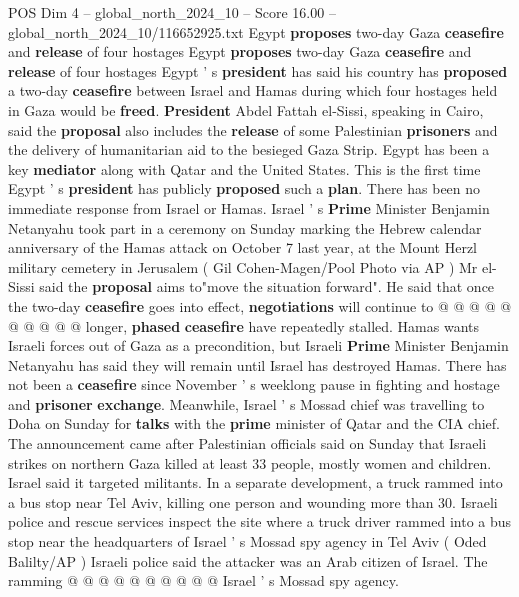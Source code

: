 \begin{textsample}{POS Dim 4 – global\_north\_2024\_10 – Score 16.00 – global\_north\_2024\_10/116652925.txt}  \label{ex:f4_pos_408}
Egypt \textbf{proposes} two-day Gaza \textbf{ceasefire} and \textbf{release} of four hostages Egypt \textbf{proposes} two-day Gaza \textbf{ceasefire} and \textbf{release} of four hostages Egypt ' s \textbf{president} has said his country has \textbf{proposed} a two-day \textbf{ceasefire} between Israel and Hamas during which four hostages held in Gaza would be \textbf{freed}. \textbf{President} Abdel Fattah el-Sissi, speaking in Cairo, said the \textbf{proposal} also includes the \textbf{release} of some Palestinian \textbf{prisoners} and the delivery of humanitarian aid to the besieged Gaza Strip.
Egypt has been a key \textbf{mediator} along with Qatar and the United States.
This is the first time Egypt ' s \textbf{president} has publicly \textbf{proposed} such a \textbf{plan}.
There has been no immediate response from Israel or Hamas.
Israel ' s \textbf{Prime} Minister Benjamin Netanyahu took part in a ceremony on Sunday marking the Hebrew calendar anniversary of the Hamas attack on October 7 last year, at the Mount Herzl military cemetery in Jerusalem ( Gil Cohen-Magen/Pool Photo via AP ) Mr el-Sissi said the \textbf{proposal} aims to"move the situation forward".
He said that once the two-day \textbf{ceasefire} goes into effect, \textbf{negotiations} will continue to @ @ @ @ @ @ @ @ @ @ longer, \textbf{phased} \textbf{ceasefire} have repeatedly stalled.
Hamas wants Israeli forces out of Gaza as a precondition, but Israeli \textbf{Prime} Minister Benjamin Netanyahu has said they will remain until Israel has destroyed Hamas.
There has not been a \textbf{ceasefire} since November ' s weeklong pause in fighting and hostage and \textbf{prisoner} \textbf{exchange}.
Meanwhile, Israel ' s Mossad chief was travelling to Doha on Sunday for \textbf{talks} with the \textbf{prime} minister of Qatar and the CIA chief.
The announcement came after Palestinian officials said on Sunday that Israeli strikes on northern Gaza killed at least 33 people, mostly women and children.
Israel said it targeted militants.
In a separate development, a truck rammed into a bus stop near Tel Aviv, killing one person and wounding more than 30.
Israeli police and rescue services inspect the site where a truck driver rammed into a bus stop near the headquarters of Israel ' s Mossad spy agency in Tel Aviv ( Oded Balilty/AP ) Israeli police said the attacker was an Arab citizen of Israel.
The ramming @ @ @ @ @ @ @ @ @ @ Israel ' s Mossad spy agency.

\end{textsample}
